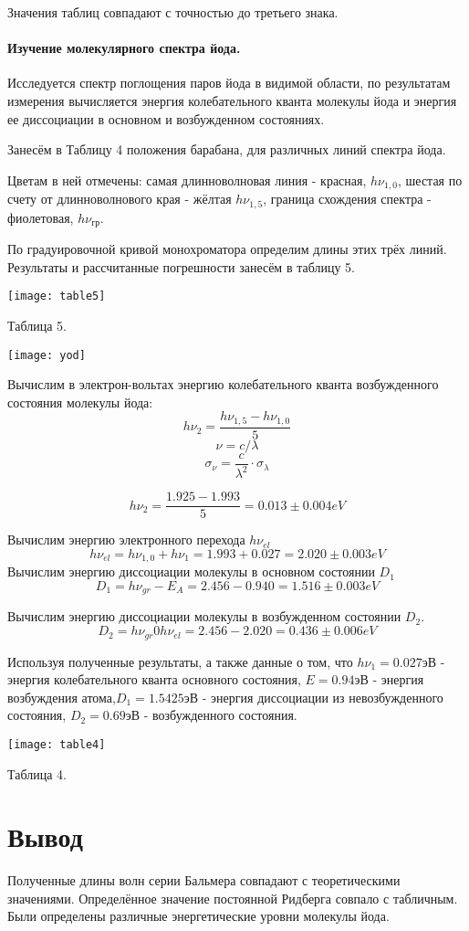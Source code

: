 \documentclass[a4paper,12pt]{article} %
\begin{document}
Значения таблиц совпадают с точностью до третьего знака.

\paragraph*{Изучение молекулярного спектра йода.}

Исследуется спектр поглощения паров йода в видимой области, по результатам измерения вычисляется энергия колебательного кванта молекулы йода и энергия ее диссоциации в основном и возбужденном состояниях.



Занесём в Таблицу 4 положения барабана, для различных линий спектра йода.

Цветам в ней отмечены: самая длинноволновая линия - красная, $h\nu_{1,0}$, шестая по счету от длинноволнового края - жёлтая $h\nu_{1,5}$, граница схождения спектра - фиолетовая, $h\nu_{\text{гр}}$. 

По градуировочной кривой монохроматора определим длины этих трёх линий. Результаты и рассчитанные погрешности занесём в таблицу 5.  

\begin{center}
\texttt{[image: table5]}

Таблица 5.

\texttt{[image: yod]}
\end{center}

Вычислим в электрон-вольтах энергию колебательного кванта возбужденного состояния молекулы йода:
\[h\nu_2 =\frac{h\nu_{1,5} - h\nu_{1, 0}}{5}\]
\[\nu = c / \lambda\]
\[\sigma_{\nu} = \frac{c}{\lambda^2}\cdot \sigma_{\lambda}\]

\[h\nu_2 = \frac{1.925-1.993}{5}=0.013\pm 0.004eV\]

Вычислим энергию электронного перехода $h\nu_{el}$
\[h\nu_{el} = h\nu_{1,0}+h\nu_1 = 1.993+0.027 = 2.020\pm0.003eV\]
Вычислим энергию диссоциации молекулы в основном состоянии $D_1$
\[D_1 = h\nu_{gr} - E_A = 2.456-0.940=1.516\pm0.003eV\]

Вычислим энергию диссоциации молекулы в возбужденном состоянии $D_2$.
\[D_2 = h\nu_{gr} 0 h\nu_{el} = 2.456 - 2.020 = 0.436\pm0.006eV\]

Используя полученные результаты, а также данные о том, что $h\nu_1 = 0.027$эВ - энергия колебательного кванта основного состояния, $E = 0.94$эВ - энергия возбуждения атома,$D_1 = 1.5425$эВ - энергия диссоциации из невозбужденного состояния, $D_2=0.69$эВ - возбужденного состояния.




\begin{center}
\texttt{[image: table4]}

Таблица 4.
\end{center}

\section*{Вывод}
Полученные длины волн серии Бальмера совпадают с теоретическими значениями. Определённое значение постоянной Ридберга совпало с табличным. Были определены различные энергетические уровни молекулы йода.
\end{document}
